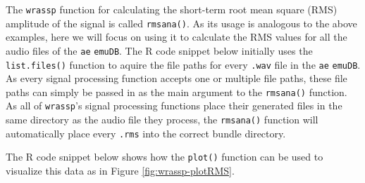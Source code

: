 \documentclass[]{book}
\newenvironment{Shaded}{\begin{snugshade}}{\end{snugshade}}
\newcommand{\CommentTok}[1]{\textcolor[rgb]{0.56,0.35,0.01}{\textit{#1}}}
\newcommand{\DataTypeTok}[1]{\textcolor[rgb]{0.13,0.29,0.53}{#1}}
\newcommand{\DecValTok}[1]{\textcolor[rgb]{0.00,0.00,0.81}{#1}}
\newcommand{\KeywordTok}[1]{\textcolor[rgb]{0.13,0.29,0.53}{\textbf{#1}}}
\newcommand{\NormalTok}[1]{#1}
\newcommand{\OperatorTok}[1]{\textcolor[rgb]{0.81,0.36,0.00}{\textbf{#1}}}
\newcommand{\OtherTok}[1]{\textcolor[rgb]{0.56,0.35,0.01}{#1}}
\newcommand{\StringTok}[1]{\textcolor[rgb]{0.31,0.60,0.02}{#1}}
\begin{document}
The \texttt{wrassp} function for calculating the short-term root mean square (RMS) amplitude of the signal is called \texttt{rmsana()}. As its usage is analogous to the above examples, here we will focus on using it to calculate the RMS values for all the audio files of the \texttt{ae} \texttt{emuDB}. The R code snippet below initially uses the \texttt{list.files()} function to aquire the file paths for every \texttt{.wav} file in the \texttt{ae} \texttt{emuDB}. As every signal processing function accepts one or multiple file paths, these file paths can simply be passed in as the main argument to the \texttt{rmsana()} function. As all of \texttt{wrassp}'s signal processing functions place their generated files in the same directory as the audio file they process, the \texttt{rmsana()} function will automatically place every \texttt{.rms} into the correct bundle directory.

\begin{Shaded}
\end{Shaded}

The R code snippet below shows how the \texttt{plot()} function can be used to visualize this data as in Figure \ref{fig:wrassp-plotRMS}.
\end{document}
